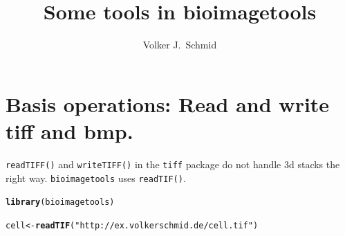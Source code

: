 \documentclass{article}\usepackage[]{graphicx}\usepackage[]{color}
\makeatletter
\newcommand{\hlstr}[1]{\textcolor[rgb]{0.192,0.494,0.8}{#1}}%
\newcommand{\hlstd}[1]{\textcolor[rgb]{0.345,0.345,0.345}{#1}}%
\newcommand{\hlkwb}[1]{\textcolor[rgb]{0.69,0.353,0.396}{#1}}%
\newcommand{\hlkwd}[1]{\textcolor[rgb]{0.737,0.353,0.396}{\textbf{#1}}}%
\newenvironment{kframe}{%
 \def\at@end@of@kframe{}%
 \ifinner\ifhmode%
  \def\at@end@of@kframe{\end{minipage}}%
  \begin{minipage}{\columnwidth}%
 \fi\fi%
 \def\FrameCommand##1{\hskip\@totalleftmargin \hskip-\fboxsep
 \colorbox{shadecolor}{##1}\hskip-\fboxsep
     \hskip-\linewidth \hskip-\@totalleftmargin \hskip\columnwidth}%
 \MakeFramed {\advance\hsize-\width
   \@totalleftmargin\z@ \linewidth\hsize
   \@setminipage}}%
 {\par\unskip\endMakeFramed%
 \at@end@of@kframe}
\newenvironment{knitrout}{}{} %
\makeatother
\begin{document}
\title{Some tools in bioimagetools}
\author[1]{Volker J.~Schmid}
\maketitle
\tableofcontents
\section{Basis operations: Read and write tiff and bmp.}

\texttt{readTIFF()} and \texttt{writeTIFF()} in the \texttt{tiff} package do not handle 3d stacks the right way. \texttt{bioimagetools} uses \texttt{readTIF()}.
\begin{knitrout}
\color{fgcolor}\begin{kframe}
\begin{alltt}
\hlkwd{library}\hlstd{(bioimagetools)}
\end{alltt}


{\ttfamily\noindent\itshape\color{messagecolor}{\#\# Loading required package: EBImage}}

{\ttfamily\noindent\itshape\color{messagecolor}{\#\# Bioimagetools ver.0.3.22}}\begin{alltt}
\hlstd{cell} \hlkwb{<-} \hlkwd{readTIF}\hlstd{(}\hlstr{"http://ex.volkerschmid.de/cell.tif"}\hlstd{)}
\end{alltt}


{\ttfamily\noindent\color{warningcolor}{\#\# Warning in readTIFF(file, all = TRUE, info = TRUE, as.is = as.is, native = native): TIFFReadDirectory: Unknown field with tag 50838 (0xc696) encountered}}


\end{kframe}
\end{knitrout}
\end{document}
